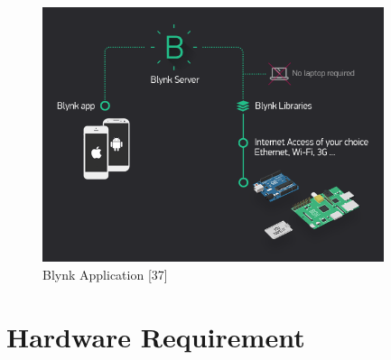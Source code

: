\documentclass[twoside,a4paper,16pt]{book}
\begin{document}
{{\begin{figure}[ht!]
	\begin{center}
		\includegraphics[width=10.0cm]{blynk2.png}
		\caption{Blynk Application [37]}
	\end{center}
\end{figure}
\chapter{Hardware Requirement}
}}
\end{document}
